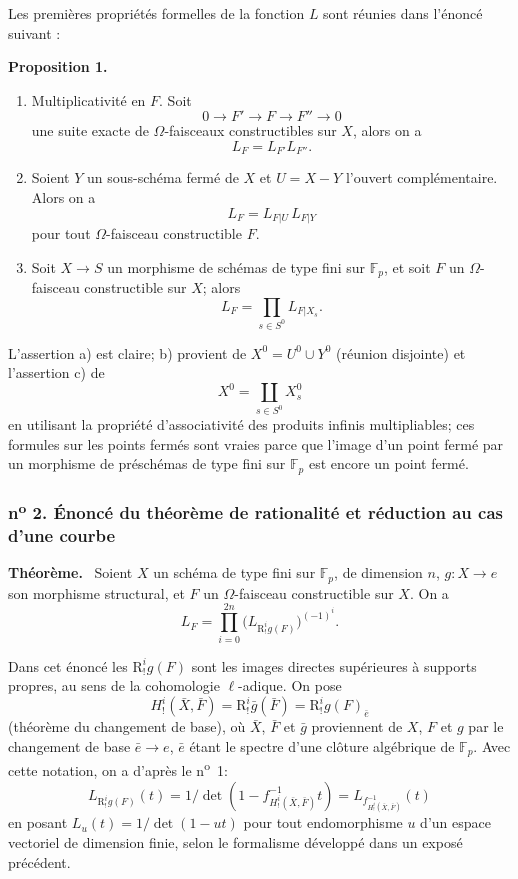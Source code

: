 \documentclass[11pt]{article}
\newenvironment{statement}[1]{\par\medskip\noindent\textbf{#1.}\ }{\par\medskip}
\newcommand{\R}{\mathrm{R}}\newcommand{\RHomCore}{\mathrm{RHom}}
\providecommand{\R}{\mathrm R}
\begin{document}
Les premières propriétés formelles de la fonction $L$ sont réunies dans l'énoncé suivant :

\begin{statement}{Proposition 1}
\begin{enumerate}[label=\alph*)]
\item Multiplicativité en $F$. Soit
\[
0\longrightarrow F'\longrightarrow F\longrightarrow F''\longrightarrow0
\]
une suite exacte de $\Omega$-faisceaux constructibles sur $X$, alors on a
\[
L_F=L_{F'}L_{F''}.
\]
\item Soient $Y$ un sous-schéma fermé de $X$ et $U=X-Y$ l'ouvert complémentaire. Alors on a
\[
L_F=L_{F|U}\,L_{F|Y}
\]
pour tout $\Omega$-faisceau constructible $F$.
\item Soit $X\to S$ un morphisme de schémas de type fini sur $\mathbb F_p$, et soit $F$ un $\Omega$-faisceau constructible sur $X$; alors
\[
L_F=\prod_{s\in S^0}L_{F|X_s}.
\]
\end{enumerate}
\end{statement}

L'assertion a) est claire; b) provient de $X^0=U^0\cup Y^0$ (réunion disjointe) et l'assertion c) de
\[
X^0=\coprod_{s\in S^0}X_s^0
\]
en utilisant la propriété d'associativité des produits infinis multipliables; ces formules sur les points fermés sont vraies parce que l'image d'un point fermé par un morphisme de préschémas de type fini sur $\mathbb F_p$ est encore un point fermé.

\subsubsection*{n\textsuperscript{o} 2. Énoncé du théorème de rationalité et réduction au cas d'une courbe}

\begin{statement}{Théorème}
Soient $X$ un schéma de type fini sur $\mathbb F_p$, de dimension $n$, $g:X\to e$ son morphisme structural, et $F$ un $\Omega$-faisceau constructible sur $X$. On a
\[
L_F=\prod_{i=0}^{2n}\bigl(L_{\R^i_!g(F)}\bigr)^{(-1)^i}.
\tag{1}
\]
\end{statement}

Dans cet énoncé les $\R^i_!g(F)$ sont les images directes supérieures à supports propres, au sens de la cohomologie $\ell$-adique. On pose
\[
H^i_!(\bar X,\bar F)=\R^i_!\bar g(\bar F)=\R^i_!g(F)_{\bar e}
\]
(théorème du changement de base), où $\bar X$, $\bar F$ et $\bar g$ proviennent de $X$, $F$ et $g$ par le changement de base $\bar e\to e$, $\bar e$ étant le spectre d'une clôture algébrique de $\mathbb F_p$. Avec cette notation, on a d'après le n\textsuperscript{o}~1:
\[
L_{\R^i_!g(F)}(t)=1/\det(1-f^{-1}_{H^i_!(\bar X,\bar F)}t)
 =L_{f^{-1}_{H^i_!(\bar X,\bar F)}}(t)
\]
en posant $L_u(t)=1/\det(1-ut)$ pour tout endomorphisme $u$ d'un espace vectoriel de dimension finie, selon le formalisme développé dans un exposé précédent.
\end{document}
